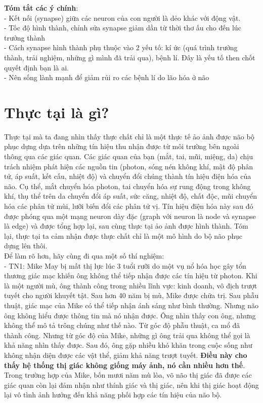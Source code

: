 \documentclass{article}
\newcommand\tab[1][1cm]{\hspace*{#1}}
\begin{document}
\tab \textbf{Tóm tắt các ý chính}: \\
\tab\tab - Kết nối (synapse) giữa các neuron của con người là dẻo khác với động vật.\\
\tab\tab - Tốc độ hình thành, chỉnh sửa synapse giảm dần từ thời thơ ấu cho đến lúc trưởng thành\\
\tab\tab - Cách synapse hình thành phụ thuộc vào 2 yếu tố: kí ức (quá trình trưởng thành, trải nghiệm, những gì mình đã trải qua), bệnh lí. Đây là yếu tố then chốt quyết định bạn là ai. \\
\tab\tab - Nên sống lành mạnh để giảm rủi ro các bệnh lí do lão hóa ở não\\

\section{Thực tại là gì?}
\tab Thực tại mà ta đang nhìn thấy thực chất chỉ là một thực tế ảo ảnh được não bộ phục dựng dựa trên những tín hiệu thu nhận được từ môi trường bên ngoài thông qua các giác quan. Các giác quan của bạn (mắt, tai, mũi, miệng, da) chịu trách nhiệm phát hiện các nguồn tin (photon, sóng nén không khí, mật độ phân tử, áp suất, kết cấu, nhiệt độ) và chuyển đổi chúng thành tín hiệu điện hóa của não. Cụ thể, mắt chuyển hóa photon, tai chuyển hóa sự rung động trong không khí, thụ thể trên da chuyển đổi áp suất, sức căng, nhiệt độ, chất độc, mũi chuyển hóa các phân tử mùi, lưỡi biến đổi các phân tử vị. Tín hiệu điện hóa này sau đó được phóng qua một mạng neuron dày đặc (graph với neuron là node và synapse là edge) và được tổng hợp lại, sau cùng thực tại ảo ảnh được hình thành. Tóm lại, thực tại ta cảm nhận được thực chất chỉ là một mô hình do bộ não phục dựng lên thôi.\\
\tab Để làm rõ hơn, hãy cùng đi qua một số thí nghiệm:\\
\tab\tab - TN1: Mike May bị mất thị lực lúc 3 tuổi rưỡi do một vụ nổ hóa học gây tổn thương giác mạc khiến ông không thể tiếp nhận được các tín hiệu từ photon. Khi là một người mù, ông thành công trong nhiều lĩnh vực: kinh doanh, vô địch trượt tuyết cho người khuyết tật. Sau hơn 40 năm bị mù, Mike được chữa trị. Sau phẫu thuật, giác mạc của Mike có thể tiếp nhận ánh sáng như bình thường. Nhưng não ông không hiểu được thông tin mà nó nhận được. Ông nhìn thấy con ông, nhưng không thể mô tả trông chúng như thế nào. Từ góc độ phẫu thuật, ca mổ đã thành công. Nhưng từ góc độ của Mike, những gì ông trải qua không thể gọi là khả năng nhìn thấy được. Sau đó, ông gặp nhiều khó khăn trong cuộc sống như không nhận diện được các vật thể, giảm khả năng trượt tuyết. \textbf{Điều này cho thấy hệ thống thị giác không giống máy ảnh, nó cần nhiều hơn thế}. Trong trường hợp của Mike, bốn mươi năm mù lòa, võ não thị giác đã được các giác quan còn lại đảm nhận như thính giác và thị giác, nên khi thị giác hoạt động lại vô tình ảnh hưởng đến khả năng phối hợp các tín hiệu của não bộ.\\
\end{document}
